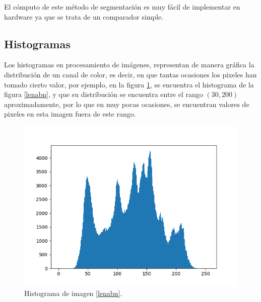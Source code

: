 \documentclass[twoside,spanish,ESP,MSc]{plantillaLabUPV}
\theoremstyle{definition}
\begin{document}
El cómputo de este método de segmentación es muy fácil de implementar en hardware ya que se trata de un comparador simple.


\subsection{Histogramas}
Los histogramas en procesamiento de imágenes, representan de manera gráfica la distribución de un canal de color, es decir, en que tantas ocasiones los pixeles han tomado cierto valor,  por ejemplo, en la figura \ref{histolena}, se encuentra el histograma de la figura \ref{lenabn}, y que su distribución se encuentra entre el rango $(30,200)$ aproximadamente, por lo que en muy pocas ocasiones, se encuentran valores de pixeles en esta imagen fuera de este rango.

\begin{figure}[!tbh] 
	\centering 
	\includegraphics[scale=.6]{ima/histolena} 
	\caption{Histograma de imagen \ref{lenabn}.} 
	\label{histolena} 
\end{figure}
\end{document}
